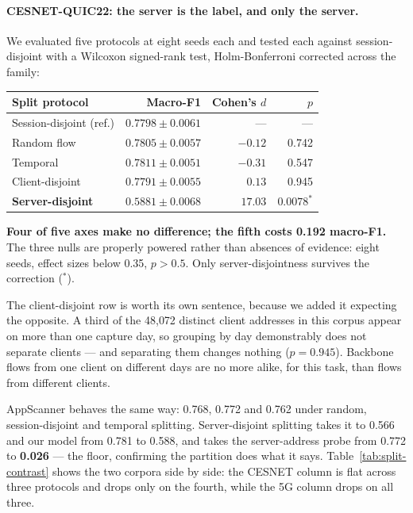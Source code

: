 \paragraph{CESNET-QUIC22: the server is the label, and only the server.} We
evaluated five protocols at eight seeds each and tested each against
session-disjoint with a Wilcoxon signed-rank test, Holm-Bonferroni corrected
across the family:

\begin{center}
\small
\begin{tabular}{lrrr}
\toprule
Split protocol & Macro-F1 & Cohen's $d$ & $p$ \\
\midrule
Session-disjoint (ref.) & $0.7798 \pm 0.0061$ & --- & --- \\
Random flow & $0.7805 \pm 0.0057$ & $-0.12$ & 0.742 \\
Temporal & $0.7811 \pm 0.0051$ & $-0.31$ & 0.547 \\
Client-disjoint & $0.7791 \pm 0.0055$ & $0.13$ & 0.945 \\
\textbf{Server-disjoint} & $\mathbf{0.5881 \pm 0.0068}$ & $\mathbf{17.03}$ & $\mathbf{0.0078}^{*}$ \\
\bottomrule
\end{tabular}
\end{center}

\textbf{Four of five axes make no difference; the fifth costs 0.192 macro-F1.}
The three nulls are properly powered rather than absences of evidence: eight
seeds, effect sizes below 0.35, $p > 0.5$. Only server-disjointness survives
the correction ($^{*}$).

The client-disjoint row is worth its own sentence, because we added it
expecting the opposite. A third of the 48{,}072 distinct client addresses in
this corpus appear on more than one capture day, so grouping by day
demonstrably does not separate clients --- and separating them changes nothing
($p = 0.945$). Backbone flows from one client on different days are no more
alike, for this task, than flows from different clients.

AppScanner behaves the same way: 0.768, 0.772 and 0.762 under random,
session-disjoint and temporal splitting. Server-disjoint splitting takes it to 0.566 and our model from 0.781 to 0.588,
and takes the server-address probe from 0.772 to \textbf{0.026} --- the floor,
confirming the partition does what it says. Table~\ref{tab:split-contrast}
shows the two corpora side by side: the CESNET column is flat across three
protocols and drops only on the fourth, while the 5G column drops on all
three.

